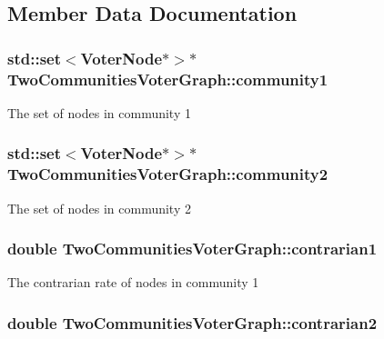 \subsection{Member Data Documentation}
\hypertarget{class_two_communities_voter_graph_a354768f44c0a3daa6d0a70a20df77af5}{
\subsubsection[{community1}]{\setlength{\rightskip}{0pt plus 5cm}std\-::set$<${\bf Voter\-Node}$\ast$$>$$\ast$ Two\-Communities\-Voter\-Graph\-::community1}}\label{class_two_communities_voter_graph_a354768f44c0a3daa6d0a70a20df77af5}
The set of nodes in community 1 \hypertarget{class_two_communities_voter_graph_a7c918c6733474caa86bc2d217bd2cb4d}{
\subsubsection[{community2}]{\setlength{\rightskip}{0pt plus 5cm}std\-::set$<${\bf Voter\-Node}$\ast$$>$$\ast$ Two\-Communities\-Voter\-Graph\-::community2}}\label{class_two_communities_voter_graph_a7c918c6733474caa86bc2d217bd2cb4d}
The set of nodes in community 2 \hypertarget{class_two_communities_voter_graph_a883bf57bf07fb2e59f05df65df859a46}{
\subsubsection[{contrarian1}]{\setlength{\rightskip}{0pt plus 5cm}double Two\-Communities\-Voter\-Graph\-::contrarian1}}\label{class_two_communities_voter_graph_a883bf57bf07fb2e59f05df65df859a46}
The contrarian rate of nodes in community 1 \hypertarget{class_two_communities_voter_graph_a4274a05f5e2ceae57de1f0e71493b9a4}{
\subsubsection[{contrarian2}]{\setlength{\rightskip}{0pt plus 5cm}double Two\-Communities\-Voter\-Graph\-::contrarian2}}\label{class_two_communities_voter_graph_a4274a05f5e2ceae57de1f0e71493b9a4}
